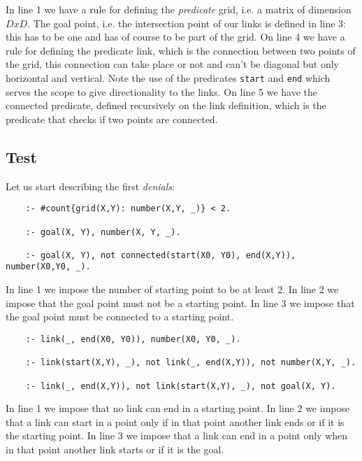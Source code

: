 In line 1 we have a rule for defining the \emph{predicate} grid, i.e. a matrix of dimension $DxD$. The goal point, i.e. the intersection point of our links is defined in line 3: this has to be one and has of course to be part of the grid.
On line 4 we have a rule for defining the predicate link, which is the connection between two points of the grid, this connection can take place or not and can't be diagonal but only horizontal and vertical. Note the use of the predicates \texttt{start} and \texttt{end} which serves the scope to give directionality to the links.
On line 5 we have the connected predicate, defined recursively on the link definition, which is the predicate that checks if two points are connected.
\subsection{Test}
Let us start describing the first \emph{denials}:

\begin{verbatim}
    :- #count{grid(X,Y): number(X,Y, _)} < 2. 

    :- goal(X, Y), number(X, Y, _). 
    
    :- goal(X, Y), not connected(start(X0, Y0), end(X,Y)), number(X0,Y0, _). 
\end{verbatim}

In line 1 we impose the number of starting point to be at least 2. In line 2 we impose that the goal point must not be a starting point.
In line 3 we impose that the goal point must be connected to a starting point.


\begin{verbatim}
    :- link(_, end(X0, Y0)), number(X0, Y0, _).

    :- link(start(X,Y), _), not link(_, end(X,Y)), not number(X,Y, _).
    
    :- link(_, end(X,Y)), not link(start(X,Y), _), not goal(X, Y). 
\end{verbatim}
In line 1 we impose that no link can end in a starting point. In line 2 we impose that a link can start in a point only if in that point another link ends or if it is the starting point. In line 3 we impose that a link can end in a point only when in that point another link starts or if it is the goal.


